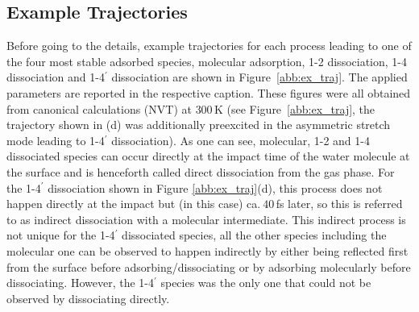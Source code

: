 \documentclass[11pt,DIV=13,BCOR=5mm,a4paper,headinclude]{scrbook}
\begin{document}
\subsection{Example Trajectories}
Before going to the details, example trajectories for each process leading to one of the four most stable adsorbed species, molecular adsorption, 1-2 dissociation, 1-4 dissociation and 1-4$^\prime$ dissociation are shown in Figure~\ref{abb:ex_traj}.
The applied parameters are reported in the respective caption.
These figures were all obtained from canonical calculations (NVT) at $300\,$K (see Figure~\ref{abb:ex_traj}, the trajectory shown in (d) was additionally preexcited in the asymmetric stretch mode leading to 1-4$^\prime$ dissociation).
As one can see, molecular, 1-2 and 1-4 dissociated species can occur directly at the impact time of the water molecule at the surface and is henceforth called direct dissociation from the gas phase.
For the 1-4$^\prime$ dissociation shown in Figure \ref{abb:ex_traj}(d), this process does not happen directly at the impact but (in this case) ca.$~40\,$fs later, so this is referred to as indirect dissociation with a molecular intermediate.
This indirect process is not unique for the 1-4$^\prime$ dissociated species, all the other species including the molecular one can be observed to happen indirectly by either being reflected first from the surface before adsorbing/dissociating or by adsorbing molecularly before dissociating.
However, the 1-4$^\prime$ species was the only one that could not be observed by dissociating directly.
\end{document}
